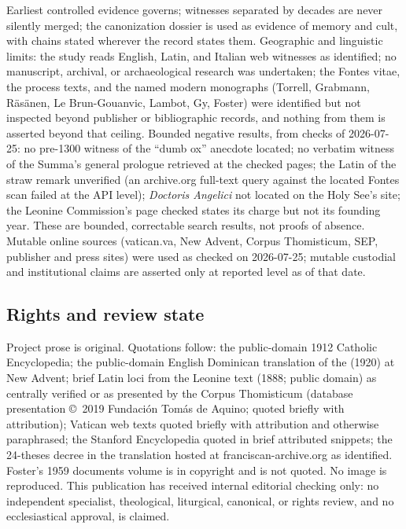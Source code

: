 Earliest controlled evidence governs; witnesses separated by decades are
never silently merged; the canonization dossier is used as evidence of
memory and cult, with chains stated wherever the record states them.
Geographic and linguistic limits: the study reads English, Latin, and
Italian web witnesses as identified; no manuscript, archival, or
archaeological research was undertaken; the Fontes vitae, the process
texts, and the named modern monographs (Torrell, Grabmann, R\"as\"anen,
Le Brun-Gouanvic, Lambot, Gy, Foster) were identified but not inspected
beyond publisher or bibliographic records, and nothing from them is
asserted beyond that ceiling. Bounded negative results, from checks of
2026-07-25: no pre-1300 witness of the ``dumb ox'' anecdote located; no
verbatim witness of the Summa's general prologue retrieved at the
checked pages; the Latin of the straw remark unverified (an archive.org
full-text query against the located Fontes scan failed at the API
level); \textit{Doctoris Angelici} not located on the Holy See's site;
the Leonine Commission's page checked states its charge but not its
founding year. These are bounded, correctable search results, not
proofs of absence. Mutable online sources (vatican.va, New Advent,
Corpus Thomisticum, SEP, publisher and press sites) were used as
checked on 2026-07-25; mutable custodial and institutional claims are
asserted only at reported level as of that date.

\subsection{Rights and review state}

Project prose is original. Quotations follow: the public-domain 1912
Catholic Encyclopedia; the public-domain English Dominican translation
of the  (1920) at New Advent; brief Latin loci from the
Leonine text (1888; public domain) as centrally verified or as
presented by the Corpus Thomisticum (database presentation \copyright\
2019 Fundaci\'on Tom\'as de Aquino; quoted briefly with attribution);
Vatican web texts quoted briefly with attribution and otherwise
paraphrased; the Stanford Encyclopedia quoted in brief attributed
snippets; the 24-theses decree in the translation hosted at
franciscan-archive.org as identified. Foster's 1959 documents volume is
in copyright and is not quoted. No image is reproduced. This
publication has received internal editorial checking only: no
independent specialist, theological, liturgical, canonical, or rights
review, and no ecclesiastical approval, is claimed.
